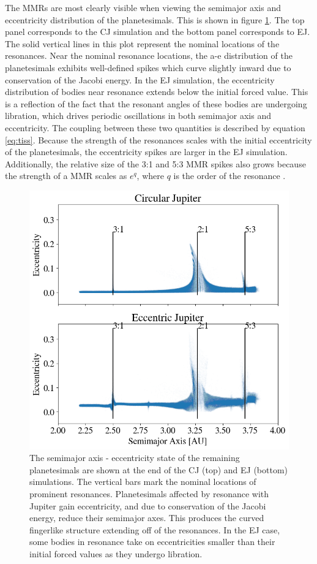 \documentclass[onecolumn]{aastex63}
\begin{document}
The MMRs are most clearly visible when viewing the semimajor axis and eccentricity distribution of the planetesimals. This is shown 
in figure \ref{fig:ae}. The top panel corresponds to the CJ simulation and the bottom panel corresponds to EJ. The solid vertical lines 
in this plot represent the nominal locations of the resonances. Near the nominal resonance locations, the a-e distribution of the 
planetesimals exhibits well-defined spikes which curve slightly inward due to conservation of the Jacobi energy. In the EJ simulation, 
the eccentricity distribution of bodies near resonance extends below the initial forced value. This is a reflection of the fact that the resonant 
angles of these bodies are undergoing libration, which drives periodic oscillations in both semimajor axis and eccentricity. The coupling 
between these two quantities is described by equation \ref{eq:tiss}. Because the strength of the resonances scales with the initial 
eccentricity of the planetesimals, the eccentricity spikes are larger in the EJ simulation. Additionally, the relative size of the 3:1 and 5:3 
MMR spikes also grows because the strength of a MMR scales as $e^{q}$, where $q$ is the order of the resonance 
\citep{1994PhyD...77..289M}.

\begin{figure}
    \begin{center}
    \includegraphics[width=0.4\columnwidth]{figures/ae.png}
    \caption{The semimajor axis - eccentricity state of the remaining planetesimals are shown at the end of the CJ (top) and EJ (bottom) 
    simulations. The vertical bars mark the nominal locations of prominent resonances. Planetesimals affected by resonance with Jupiter gain
     eccentricity, and due to conservation of the Jacobi energy, reduce their semimajor axes. This produces the curved fingerlike structure 
     extending off of the resonances. In the EJ case, some bodies in resonance take on eccentricities smaller than their initial forced values as 
     they undergo libration.\label{fig:ae}}
    \end{center}
\end{figure}
\end{document}
